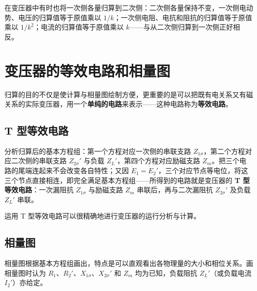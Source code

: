 在变压器中有时也将一次侧各量归算到二次侧：二次侧各量保持不变，一次侧电动势、电压的归算值等于原值乘以 $1/k$；一次侧电阻、电抗和阻抗的归算值等于原值乘以 $1/k^2$；电流的归算值等于原值乘以 $k$——与从二次侧归算到一次侧正好相反。


\section{变压器的等效电路和相量图}

归算的目的不仅是使计算与相量图绘制方便，更重要的是可以把既有电关系又有磁关系的实际变压器，用一个\textbf{单纯的电路}来表示——这种电路称为\textbf{等效电路}。

\subsection{T 型等效电路}
分析归算后的基本方程组：第一个方程对应一次侧的串联支路 $Z_{1\sigma}$，第二个方程对应二次侧的串联支路 $Z_{2\sigma}'$ 与负载 $Z_L'$，第四个方程对应励磁支路 $Z_m$。把三个电路的尾端连起来不会改变各自特性；又因 $\dot E_1=\dot E_2'$，三个对应节点等电位，将这三个节点直接相连，即完全满足基本方程组——所得到的电路就是变压器的 \textbf{T 型等效电路}：一次漏阻抗 $Z_{1\sigma}$ 与励磁支路 $Z_m$ 串联后，再与二次漏阻抗 $Z_{2\sigma}'$ 及负载 $Z_L'$ 串联。

运用 T 型等效电路可以很精确地进行变压器的运行分析与计算。

\subsection{相量图}
相量图根据基本方程组画出，特点是可以直观看出各物理量的大小和相位关系。画相量图时认为 $R_1$、$R_2'$、$X_{1\sigma}$、$X_{2\sigma}'$ 和 $Z_m$ 均为已知，负载阻抗 $Z_L'$（或负载电流 $\dot I_2'$）亦给定。


